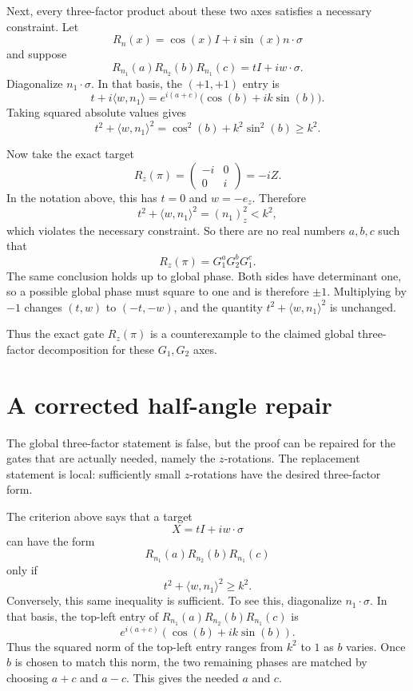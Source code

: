 \documentclass[11pt]{article}
\newcommand{\ii}{i}
\newcommand{\Rz}{R_z}
\newcommand{\Gone}{G_1}
\newcommand{\Gtwo}{G_2}
\newcommand{\pauli}{\sigma}
\begin{document}
Next, every three-factor product about these two axes satisfies a necessary
constraint.  Let
\[
  R_n(x)=\cos(x)I+\ii\sin(x)n\cdot\pauli
\]
and suppose
\[
  R_{n_1}(a)R_{n_2}(b)R_{n_1}(c)=tI+\ii w\cdot\pauli.
\]
Diagonalize $n_1\cdot\pauli$.  In that basis, the $(+1,+1)$ entry is
\[
  t+\ii\langle w,n_1\rangle
  =
  e^{\ii(a+c)}\bigl(\cos(b)+\ii k\sin(b)\bigr).
\]
Taking squared absolute values gives
\[
  t^2+\langle w,n_1\rangle^2
  =
  \cos^2(b)+k^2\sin^2(b)
  \geq k^2.
\]

Now take the exact target
\[
  \Rz(\pi)
  =
  \begin{pmatrix}
    -\ii & 0\\
    0 & \ii
  \end{pmatrix}
  =
  -\ii Z.
\]
In the notation above, this has $t=0$ and $w=-e_z$.  Therefore
\[
  t^2+\langle w,n_1\rangle^2=(n_1)_z^2<k^2,
\]
which violates the necessary constraint.  So there are no real numbers
$a,b,c$ such that
\[
  \Rz(\pi)=\Gone^a\Gtwo^b\Gone^c.
\]
The same conclusion holds up to global phase.  Both sides have determinant
one, so a possible global phase must square to one and is therefore $\pm1$.
Multiplying by $-1$ changes $(t,w)$ to $(-t,-w)$, and the quantity
$t^2+\langle w,n_1\rangle^2$ is unchanged.

Thus the exact gate $\Rz(\pi)$ is a counterexample to the claimed global
three-factor decomposition for these $G_1,G_2$ axes.

\section*{A corrected half-angle repair}

The global three-factor statement is false, but the proof can be repaired for
the gates that are actually needed, namely the $z$-rotations.  The replacement
statement is local: sufficiently small $z$-rotations have the desired
three-factor form.

The criterion above says that a target
\[
  X=tI+\ii w\cdot\pauli
\]
can have the form
\[
  R_{n_1}(a)R_{n_2}(b)R_{n_1}(c)
\]
only if
\[
  t^2+\langle w,n_1\rangle^2\geq k^2.
\]
Conversely, this same inequality is sufficient.  To see this, diagonalize
$n_1\cdot\pauli$.  In that basis, the top-left entry of
$R_{n_1}(a)R_{n_2}(b)R_{n_1}(c)$ is
\[
  e^{\ii(a+c)}(\cos(b)+\ii k\sin(b)).
\]
Thus the squared norm of the top-left entry ranges from $k^2$ to $1$ as $b$
varies.  Once $b$ is chosen to match this norm, the two remaining phases are
matched by choosing $a+c$ and $a-c$.  This gives the needed $a$ and $c$.
\end{document}
